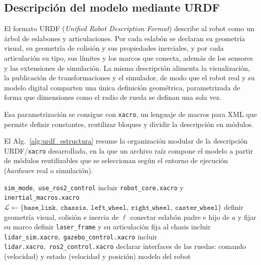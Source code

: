 \subsection{Descripción del modelo mediante URDF}
\label{sec:urdf_marco}

El formato URDF (\textit{Unified Robot Description Format}) describe al robot
como un árbol de eslabones y articulaciones. Por cada eslabón se declaran su
geometría visual, su geometría de colisión y sus propiedades inerciales, y por
cada articulación su tipo, sus límites y los marcos que conecta, además de los
sensores y las extensiones de simulación. La misma descripción alimenta la
visualización, la publicación de transformaciones y el simulador, de modo que
el robot real y su modelo digital comparten una única definición geométrica,
parametrizada de forma que dimensiones como el radio de rueda se definan una
sola vez.

Esa parametrización se consigue con \texttt{xacro}, un lenguaje de macros
para XML que permite definir constantes, reutilizar bloques y dividir la
descripción en módulos.

El Alg.~\ref{alg:urdf_estructura} resume la organización modular de la
descripción URDF/\texttt{xacro} desarrollada, en la que un archivo raíz
compone el modelo a partir de módulos reutilizables que se seleccionan según
el entorno de ejecución (\textit{hardware} real o simulación).

\begin{algorithm}[htbp]
\caption{Construcción del modelo URDF/\texttt{xacro} del robot.}
\label{alg:urdf_estructura}
\begin{algorithmic}[1]
\Require \texttt{sim\_mode},\ \texttt{use\_ros2\_control}
 
\State incluir \texttt{robot\_core.xacro} y \texttt{inertial\_macros.xacro}
\State $\mathcal{L} \gets \{\texttt{base\_link},\ \texttt{chassis},\ \texttt{left\_wheel},\ \texttt{right\_wheel},\ \texttt{caster\_wheel}\}$
\State definir geometría visual, colisión e inercia de $\ell$
\EndFor
{}
\State conectar eslabón padre e hijo de $a$ y fijar su marco
\EndFor
\State definir \texttt{laser\_frame} y su articulación fija al chasis
\State incluir \texttt{lidar\_sim.xacro},\ \texttt{gazebo\_control.xacro}
\Else
\State incluir \texttt{lidar.xacro},\ \texttt{ros2\_control.xacro}
\EndIf
{}
\State declarar interfaces de las ruedas: comando (velocidad) y estado (velocidad y posición)
\EndIf
\State \Return modelo del robot
\EndProcedure
\end{algorithmic}
\end{algorithm}

